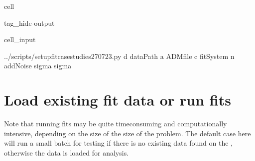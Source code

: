 \documentclass[letterpaper,table,10pt,english]{jupyterBook}
\begin{document}
\begin{sphinxuseclass}{cell}
\begin{sphinxuseclass}{tag_hide-output}\begin{sphinxVerbatimInput}

\begin{sphinxuseclass}{cell_input}
\begin{sphinxVerbatim}[commandchars=\\\{\}]

  
  

 \PYGZdq{}../scripts/setup\PYGZus{}fit\PYGZus{}case\PYGZhy{}studies\PYGZus{}270723.py\PYGZdq{} \PYGZhy{}d \PYGZob{}dataPath\PYGZcb{} \PYGZhy{}a \PYGZob{}ADMfile\PYGZcb{} \PYGZhy{}c \PYGZob{}fitSystem\PYGZcb{} \PYGZhy{}n \PYGZob{}addNoise\PYGZcb{} \PYGZhy{}\PYGZhy{}sigma \PYGZob{}sigma\PYGZcb{}
\end{sphinxVerbatim}

\end{sphinxuseclass}\end{sphinxVerbatimInput}

\end{sphinxuseclass}
\end{sphinxuseclass}

\section{Load existing fit data or run fits}
\label{\detokenize{part2/case-study-C2H4_290723:load-existing-fit-data-or-run-fits}}
\sphinxAtStartPar
Note that running fits may be quite time\sphinxhyphen{}consuming and computationally intensive, depending on the size of the size of the problem. The default case here will run a small batch for testing if there is no existing data found on the , otherwise the data is loaded for analysis.
\end{document}
